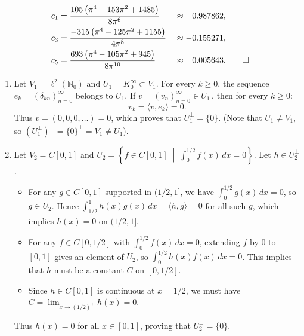 \begin{exercisesolution*}
\begin{align*}
c_1 &= \frac{105\left(\pi^4 - 153\pi^2 + 1485\right)}{8\pi^6} && \approx \phantom{-}0.987862, \\
c_3 &= \frac{-315\left(\pi^4 - 125\pi^2 + 1155\right)}{4\pi^8} && \approx -0.155271, \\
c_5 &= \frac{693\left(\pi^4 - 105\pi^2 + 945\right)}{8\pi^{10}} && \approx \phantom{-}0.005643. \qedhere
\end{align*}
\end{exercisesolution*}

\begin{exercisesolution*}
\label{sol:infinite_dim_orthogonal_complements}
\begin{enumerate}[label=\textbf{(\alph*)}]
    \item Let $V_1 = \ell^2(\mathbb{N}_0)$ and $U_1 = K_0^\infty \subset V_1$.
    For every $k \ge 0$, the sequence $e_k = (\delta_{kn})_{n=0}^\infty$ belongs to $U_1$.
    If $v = (v_n)_{n=0}^\infty \in U_1^\perp$, then for every $k \ge 0$:
    \[
    v_k = \langle v, e_k \rangle = 0.
    \]
    Thus $v = (0, 0, 0, \dots) = 0$, which proves that $U_1^\perp = \{0\}$.
    (Note that $U_1 \ne V_1$, so $(U_1^\perp)^\perp = \{0\}^\perp = V_1 \ne U_1$).

    \item Let $V_2 = C[0, 1]$ and $U_2 = \left\{ f \in C[0, 1] \;\middle|\; \int_0^{1/2} f(x) \, dx = 0 \right\}$.
    Let $h \in U_2^\perp$.
    \begin{itemize}
        \item For any $g \in C[0, 1]$ supported in $(1/2, 1]$, we have $\int_0^{1/2} g(x)\,dx = 0$, so $g \in U_2$.
        Hence $\int_{1/2}^1 h(x) g(x)\,dx = \langle h, g \rangle = 0$ for all such $g$, which implies $h(x) = 0$ on $(1/2, 1]$.
        \item For any $f \in C[0, 1/2]$ with $\int_0^{1/2} f(x)\,dx = 0$, extending $f$ by $0$ to $[0, 1]$ gives an element of $U_2$, so $\int_0^{1/2} h(x) f(x)\,dx = 0$.
        This implies that $h$ must be a constant $C$ on $[0, 1/2]$.
        \item Since $h \in C[0, 1]$ is continuous at $x = 1/2$, we must have $C = \lim_{x \to (1/2)^+} h(x) = 0$.
    \end{itemize}
    Thus $h(x) = 0$ for all $x \in [0, 1]$, proving that $U_2^\perp = \{0\}$. \qedhere
\end{enumerate}
\end{exercisesolution*}

